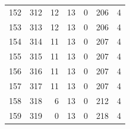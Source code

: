 \documentclass[a4paper,twoside,12pt]{book}
\begin{document}
\begin{appendices}
\begin{table}
\begin{tabular}{lrrrrrr}
		152 &    312 &        12 &        13 &               0 &             206 &         4 \\
		153 &    313 &        12 &        13 &               0 &             206 &         4 \\
		154 &    314 &        11 &        13 &               0 &             207 &         4 \\
		155 &    315 &        11 &        13 &               0 &             207 &         4 \\
		156 &    316 &        11 &        13 &               0 &             207 &         4 \\
		157 &    317 &        11 &        13 &               0 &             207 &         4 \\
		158 &    318 &         6 &        13 &               0 &             212 &         4 \\
		159 &    319 &         0 &        13 &               0 &             218 &         4 \\
		\bottomrule
	\end{tabular}				
\end{table}	


\end{appendices}
\end{document}
